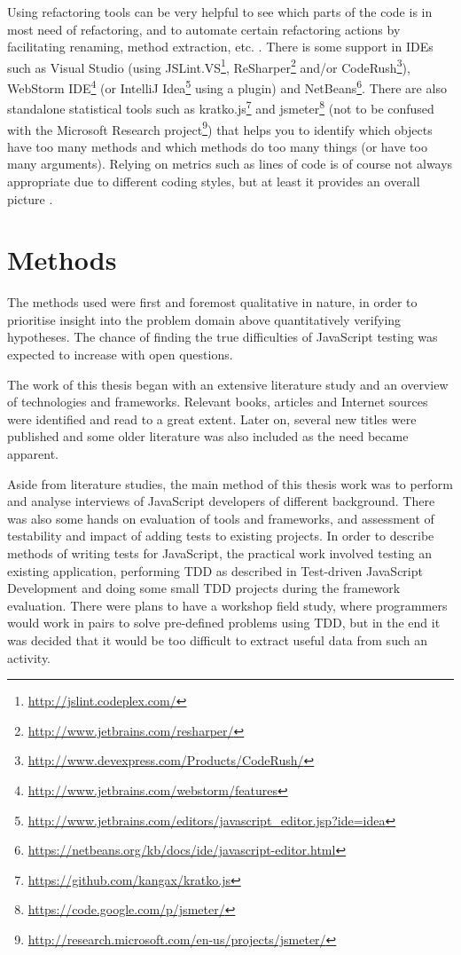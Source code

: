 \documentclass[11pt]{article}
\begin{document}
Using refactoring tools can be very helpful to see which parts of the code is in most need of refactoring, and to automate certain refactoring actions by facilitating renaming, method extraction, etc. \cite[ch.~5]{Legacy}. There is some support in IDEs such as Visual Studio (using
JSLint.VS\footnote{\url{http://jslint.codeplex.com/}},
ReSharper\footnote{\url{http://www.jetbrains.com/resharper/}} and/or
CodeRush\footnote{\url{http://www.devexpress.com/Products/CodeRush/}}),
WebStorm IDE\footnote{\url{http://www.jetbrains.com/webstorm/features}} (or
IntelliJ Idea\footnote{\url{http://www.jetbrains.com/editors/javascript_editor.jsp?ide=idea}} using a plugin) and
NetBeans\footnote{\url{https://netbeans.org/kb/docs/ide/javascript-editor.html}}. There are also standalone statistical tools such as
kratko.js\footnote{\url{https://github.com/kangax/kratko.js}} and
jsmeter\footnote{\url{https://code.google.com/p/jsmeter/}} (not to be confused with the
Microsoft Research project\footnote{\url{http://research.microsoft.com/en-us/projects/jsmeter/}}) that helps you to identify which objects have too many methods and which methods do too many things (or have too many arguments). Relying on metrics such as lines of code is of course not always appropriate due to different coding styles, but at least it provides an overall picture \cite{Kratko}.

\section{Methods}

The methods used were first and foremost qualitative in nature, in order to prioritise insight into the problem domain above quantitatively verifying hypotheses. The chance of finding the true difficulties of JavaScript testing was expected to increase with open questions.

The work of this thesis began with an extensive literature study and an overview of technologies and frameworks. Relevant books, articles and Internet sources were identified and read to a great extent. Later on, several new titles were published and some older literature was also included as the need became apparent.

Aside from literature studies, the main method of this thesis work was to perform and analyse interviews of JavaScript developers of different background. There was also some hands on evaluation of tools and frameworks, and assessment of testability and impact of adding tests to existing projects. In order to describe methods of writing tests for JavaScript, the practical work involved testing an existing application, performing TDD as described in Test-driven JavaScript Development\cite{Tddjs} and doing some small TDD projects during the framework evaluation. There were plans to have a workshop field study, where programmers would work in pairs to solve pre-defined problems using TDD, but in the end it was decided that it would be too difficult to extract useful data from such an activity.
\end{document}
